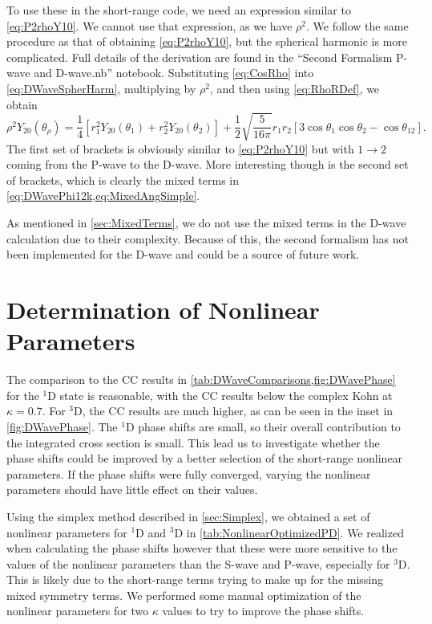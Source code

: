 \documentclass[Dissertation.tex]{subfiles}
\begin{document}
To use these in the short-range code, we need an expression similar to
\cref{eq:P2rhoY10}. We cannot use that expression, as we have $\rho^2$. We
follow the same procedure as that of obtaining \cref{eq:P2rhoY10}, but the
spherical harmonic is more complicated. Full details of the derivation are
found in the ``Second Formalism P-wave and D-wave.nb'' notebook.
Substituting \cref{eq:CosRho} into \cref{eq:DWaveSpherHarm}, multiplying by
$\rho^2$, and then using \cref{eq:RhoRDef}, we obtain
\begin{equation}
\label{eq:rhoident2}
\rho^2 Y_{20}(\theta_\rho) = \frac{1}{4} \left[r_1^2 Y_{20}(\theta_1) + r_2^2 Y_{20}(\theta_2) \right] + \frac{1}{2} \sqrt{\frac{5}{16 \pi}} 
   r_1 r_2 \left[3 \cos\theta_1 \cos\theta_2 - \cos\theta_{12} \right].
\end{equation}
The first set of brackets is obviously similar to \cref{eq:P2rhoY10} but with
$1 \to 2$ coming from the P-wave to the D-wave. More interesting though is the
second set of brackets, which is clearly the mixed terms in
\cref{eq:DWavePhi12k,eq:MixedAngSimple}.

As mentioned in \cref{sec:MixedTerms}, we do not use the mixed terms in the
D-wave calculation due to their complexity. Because of this, the second
formalism has not been implemented for the D-wave and could be a source of
future work.


\section{Determination of Nonlinear Parameters}
\label{sec:DWaveNonlinear}

The comparison to the CC results \cite{Walters2004,Blackwood2002}
in \cref{tab:DWaveComparisons,fig:DWavePhase} for the $^1$D state is
reasonable, with the CC results below the complex Kohn at $\kappa = 0.7$.
For $^3$D, the CC results are much higher, as can be seen in the inset
in \cref{fig:DWavePhase}. The $^1$D phase shifts are small, so their overall
contribution to the integrated cross section is small. 
This lead us to investigate whether the phase shifts could be improved by a
better selection of the short-range nonlinear parameters. If the phase shifts
were fully converged, varying the nonlinear parameters should have little
effect on their values.

Using the simplex method described in \cref{sec:Simplex}, we obtained a set of
nonlinear parameters for $^1$D and $^3$D in \cref{tab:NonlinearOptimizedPD}.
We realized when calculating the phase shifts however that these were more
sensitive to the values of the nonlinear parameters than the S-wave and P-wave,
especially for $^3$D. This is likely due to the short-range terms trying to
make up for the missing mixed symmetry terms. We performed some manual
optimization of the nonlinear parameters for two $\kappa$ values to try to
improve the phase shifts.
\end{document}
